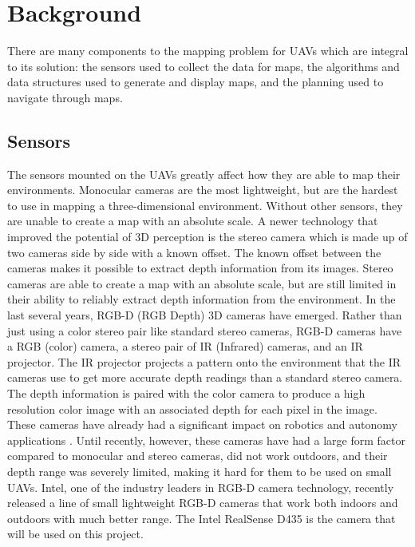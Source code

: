 \documentclass[12pt, letterpaper]{article}
\begin{document}
\section{Background}

There are many components to the mapping problem for UAVs which are integral to its solution: the sensors used to collect the data for maps, the algorithms and data structures used to generate and display maps, and the planning used to navigate through maps.

\subsection{Sensors} 
The sensors mounted on the UAVs greatly affect how they are able to map their environments. Monocular cameras are the most lightweight, but are the hardest to use in mapping a three-dimensional environment. Without other sensors, they are unable to create a map with an absolute scale. A newer technology that improved the potential of 3D perception is the stereo camera which is made up of two cameras side by side with a known offset. The known offset between the cameras makes it possible to extract depth information from its images. Stereo cameras are able to create a map with an absolute scale, but are still limited in their ability to reliably extract depth information from the environment. In the last several years, RGB-D (RGB Depth) 3D cameras have emerged. Rather than just using a color stereo pair like standard stereo cameras, RGB-D cameras have a RGB (color) camera, a stereo pair of IR (Infrared) cameras, and an IR projector. The IR projector projects a pattern onto the environment that the IR cameras use to get more accurate depth readings than a standard stereo camera. The depth information is paired with the color camera to produce a high resolution color image with an associated depth for each pixel in the image.  These cameras have already had a significant impact on robotics and autonomy applications \cite{Henry2010}. Until recently, however, these cameras have had a large form factor compared to monocular and stereo cameras, did not work outdoors, and their depth range was severely limited, making it hard for them to be used on small UAVs. Intel, one of the industry leaders in RGB-D camera technology, recently released a line of small lightweight RGB-D cameras that work both indoors and outdoors with much better range. The Intel RealSense D435 is the camera that will be used on this project.
\end{document}
